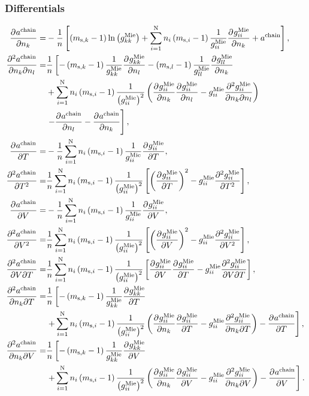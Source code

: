 \documentclass[english]{../thermomemo/thermomemo}
\newcommand*{\pd}[3][]{\frac{\partial^{#1}#2}{\partial{#3}^{#1}}}%
\newcommand*{\pdc}[3]{\frac{\partial^{2}#1}{\partial{#2}\partial{#3}}}%
\newcommand*{\lb}{\left(}
\newcommand*{\rb}{\right)}
\newcommand{\mie}{\text{Mie}\xspace}
\newcommand{\chain}{\ensuremath{\text{chain}}\xspace}
\newcommand{\seg}{\ensuremath{\text{s}}\xspace}
\newcommand{\nc}{\ensuremath{\text{N}}\xspace}
\begin{document}
\subsubsection{Differentials}
\begin{align}
  \label{eq:a_chain_mixtures_diff}
  \pd{a^\chain}{n_k} =& -\frac{1}{n} \left[\lb m_{\seg,k} -1\rb \ln \lb g_{kk}^\mie \rb +\sum_{i=1}^\nc n_i\lb m_{\seg,i} -1\rb \frac{1}{g_{ii}^\mie} \pd{g_{ii}^\mie}{n_k} + a^\chain\right],\\
  \pdc{a^\chain}{n_k}{n_l} =& \frac{1}{n} \left[-\lb m_{\seg,k} -1\rb \frac{1}{g_{kk}^\mie} \pd{g_{kk}^\mie}{n_l} -\lb m_{\seg,l} -1\rb \frac{1}{g_{ll}^\mie} \pd{g_{ll}^\mie}{n_k} \right. \nonumber\\ &  +\sum_{i=1}^\nc n_i\lb m_{\seg,i} -1\rb \frac{1}{\lb g_{ii}^\mie \rb^2} \lb\pd{g_{ii}^\mie}{n_k}\pd{g_{ii}^\mie}{n_l}-g_{ii}^\mie \pdc{g_{ii}^\mie}{n_k}{n_l}\rb \nonumber \\ & \left. - \pd{a^\chain}{n_l} - \pd{a^\chain}{n_k} \vphantom{\sum_{i=1}^\nc\frac{1}{g_{ii}^\mie} \pdc{g_{ii}^\mie}{n_k}{n_l}}\right],\\
  \pd{a^\chain}{T} =& -\frac{1}{n}\sum_{i=1}^\nc n_i\lb m_{\seg,i} -1\rb \frac{1}{g_{ii}^\mie}\pd{g_{ii}^\mie}{T},\\
  \pd[2]{a^\chain}{T} =& \frac{1}{n}\sum_{i=1}^\nc n_i\lb m_{\seg,i} -1\rb \frac{1}{\lb g_{ii}^\mie \rb^2}\left[\lb \pd{g_{ii}^\mie}{T} \rb^2 - g_{ii}^\mie\pd[2]{g_{ii}^\mie}{T}\right],\\
    \pd{a^\chain}{V} =& -\frac{1}{n}\sum_{i=1}^\nc n_i\lb m_{\seg,i} -1\rb \frac{1}{g_{ii}^\mie}\pd{g_{ii}^\mie}{V},\\
  \pd[2]{a^\chain}{V} =& \frac{1}{n}\sum_{i=1}^\nc n_i\lb m_{\seg,i} -1\rb \frac{1}{\lb g_{ii}^\mie \rb^2}\left[\lb \pd{g_{ii}^\mie}{V} \rb^2 - g_{ii}^\mie\pd[2]{g_{ii}^\mie}{V}\right],\\
  \pdc{a^\chain}{V}{T} =& \frac{1}{n}\sum_{i=1}^\nc n_i\lb m_{\seg,i} -1\rb \frac{1}{\lb g_{ii}^\mie \rb^2}\left[\pd{g_{ii}^\mie}{V}\pd{g_{ii}^\mie}{T} - g_{ii}^\mie\pdc{g_{ii}^\mie}{V}{T}\right],\\
  \pdc{a^\chain}{n_k}{T} =& \frac{1}{n} \left[-\lb m_{\seg,k} -1\rb \frac{1}{g_{kk}^\mie}\pd{g_{kk}^\mie}{T} \right. \nonumber \\& \left. +\sum_{i=1}^\nc n_i\lb m_{\seg,i} - 1\rb \frac{1}{\lb g_{ii}^\mie\rb^2}\lb \pd{g_{ii}^\mie}{n_k}\pd{g_{ii}^\mie}{T}  - g_{ii}^\mie \pdc{g_{ii}^\mie}{n_k}{T}\rb - \pd{a^\chain}{T}\right],\\
  \pdc{a^\chain}{n_k}{V} =& \frac{1}{n} \left[-\lb m_{\seg,k} -1\rb \frac{1}{g_{kk}^\mie}\pd{g_{kk}^\mie}{V} \right. \nonumber \\& \left. +\sum_{i=1}^\nc n_i\lb m_{\seg,i} - 1\rb \frac{1}{\lb g_{ii}^\mie\rb^2}\lb \pd{g_{ii}^\mie}{n_k}\pd{g_{ii}^\mie}{V}  - g_{ii}^\mie \pdc{g_{ii}^\mie}{n_k}{V}\rb - \pd{a^\chain}{V}\right].
\end{align}
\end{document}
